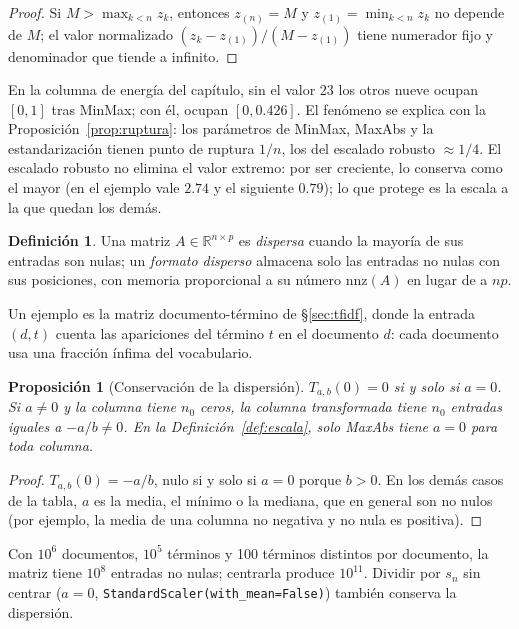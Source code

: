 \documentclass[11pt,a4paper]{article}
\theoremstyle{plain}
\newtheorem{proposicion}[teorema]{Proposición}
\theoremstyle{definition}
\newtheorem{definicion}[teorema]{Definición}
\theoremstyle{remark}
\newcommand{\R}{\mathbb{R}}
\newcommand{\1}{\mathbf{1}}
\begin{document}
\begin{proof}
Si $M>\max_{k<n}z_k$, entonces $z_{(n)}=M$ y $z_{(1)}=\min_{k<n}z_k$ no
depende de $M$; el valor normalizado $(z_k-z_{(1)})/(M-z_{(1)})$ tiene
numerador fijo y denominador que tiende a infinito.
\end{proof}

En la columna de energía del capítulo, sin el valor $23$ los otros nueve
ocupan $[0,1]$ tras MinMax; con él, ocupan $[0,0.426]$. El fenómeno se
explica con la Proposición~\ref{prop:ruptura}: los parámetros de MinMax,
MaxAbs y la estandarización tienen punto de ruptura $1/n$, los del
escalado robusto $\approx1/4$. El escalado robusto no elimina el valor
extremo: por ser creciente, lo conserva como el mayor (en el ejemplo vale
$2.74$ y el siguiente $0.79$); lo que protege es la escala a la que quedan
los demás.

\begin{definicion}
Una matriz $A\in\R^{n\times p}$ es \emph{dispersa} cuando la mayoría de sus
entradas son nulas; un \emph{formato disperso} almacena solo las entradas
no nulas con sus posiciones, con memoria proporcional a su número
$\mathrm{nnz}(A)$ en lugar de a $np$.
\end{definicion}

Un ejemplo es la matriz documento-término de \S\ref{sec:tfidf}, donde la
entrada $(d,t)$ cuenta las apariciones del término $t$ en el documento
$d$: cada documento usa una fracción ínfima del vocabulario.

\begin{proposicion}[Conservación de la dispersión]\label{prop:sparse}
$T_{a,b}(0)=0$ si y solo si $a=0$. Si $a\ne0$ y la columna tiene $n_0$
ceros, la columna transformada tiene $n_0$ entradas iguales a $-a/b\neq0$.
En la Definición~\ref{def:escala}, solo MaxAbs tiene $a=0$ para toda
columna.
\end{proposicion}

\begin{proof}
$T_{a,b}(0)=-a/b$, nulo si y solo si $a=0$ porque $b>0$. En los demás
casos de la tabla, $a$ es la media, el mínimo o la mediana, que en general
son no nulos (por ejemplo, la media de una columna no negativa y no nula es
positiva).
\end{proof}

Con $10^6$ documentos, $10^5$ términos y 100 términos distintos por
documento, la matriz tiene $10^8$ entradas no nulas; centrarla produce
$10^{11}$. Dividir por $s_n$ sin centrar ($a=0$,
\texttt{StandardScaler(with\_mean=False)}) también conserva la
dispersión.
\end{document}
